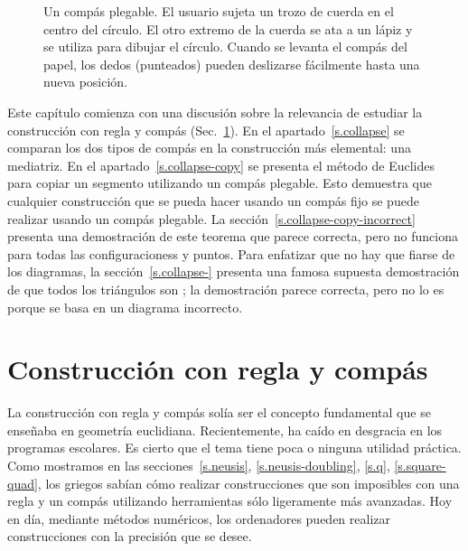 \begin{figure}[htb]
\begin{minipage}{.45\textwidth}
\caption{Un compás plegable. El usuario sujeta un trozo de cuerda en el centro del círculo. El otro extremo de la cuerda se ata a un lápiz y se utiliza para dibujar el círculo. Cuando se levanta el compás del papel, los dedos (punteados) pueden deslizarse fácilmente hasta una nueva posición.}\label{fig.collapsing-compass}
\end{minipage}
\end{figure}

Este capítulo comienza con una discusión sobre la relevancia de estudiar la construcción con regla y compás (Sec.~\ref{s.relevance}).
En el apartado~\ref{s.collapse} se comparan los dos tipos de compás en la construcción más elemental: una mediatriz. En el apartado~\ref{s.collapse-copy} se presenta el método de Euclides para copiar un segmento utilizando un compás plegable. Esto demuestra que cualquier construcción que se pueda hacer usando un compás fijo se puede realizar usando un compás plegable. La sección~\ref{s.collapse-copy-incorrect} presenta una demostración de este teorema que parece correcta, pero no funciona para todas las configuracioness y puntos. Para enfatizar que no hay que fiarse de los diagramas, la sección~\ref{s.collapse-} presenta una famosa supuesta demostración de que todos los triángulos son ; la demostración parece correcta, pero no lo es porque se basa en un diagrama incorrecto.

\section{Construcción con regla y compás}\label{s.relevance}

La construcción con regla y compás solía ser el concepto fundamental que se enseñaba en geometría euclidiana. Recientemente, ha caído en desgracia en los programas escolares. Es cierto que el tema tiene poca o ninguna utilidad práctica. Como mostramos en las secciones~\ref{s.neusis}, \ref{s.neusis-doubling}, \ref{s.q}, \ref{s.square-quad}, los griegos sabían cómo realizar construcciones que son imposibles con una regla y un compás utilizando herramientas sólo ligeramente más avanzadas. Hoy en día, mediante métodos numéricos, los ordenadores pueden realizar construcciones con la precisión que se desee.

